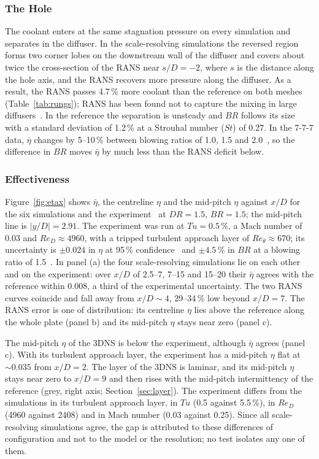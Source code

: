 \documentclass[colorlinks,upint,subscriptcorrection,varvw,hyphenate,balance,lineno]{asmeconf}
\newcommand*{\BR}{\mathit{BR}}
\newcommand*{\DR}{\mathit{DR}}
\newcommand*{\Reth}{\mathit{Re}_\theta}
\newcommand*{\ReD}{\mathit{Re}_D}
\newcommand*{\Tu}{\mathit{Tu}}
\newcommand*{\St}{\mathit{St}}
\newcommand*{\etab}{\bar\eta}
\begin{document}
\subsubsection{The Hole}

The coolant enters at the same stagnation pressure on every simulation and separates in the diffuser. In the
scale-resolving simulations the reversed region forms two corner lobes on the downstream wall of the diffuser and
covers about twice the cross-section of the RANS near $s/D=-2$, where $s$ is the distance along the hole axis, and
the RANS recovers more pressure along the diffuser. As a result, the RANS passes 4.7\,\% more coolant than the
reference on both meshes (Table~\ref{tab:rungs}); RANS has been found not to capture the mixing in large
diffusers~\cite{haydt2018}. In the reference the
separation is unsteady and $\BR$ follows its size with a standard deviation of 1.2\,\% at a Strouhal number ($\St$)
of 0.27. In the 7-7-7 data, $\etab$ changes by 5--10\,\% between blowing ratios of 1.0, 1.5 and
2.0~\cite{schroeder2014}, so the difference in $\BR$ moves $\etab$ by much less than the RANS deficit below.

\subsubsection{Effectiveness}

Figure~\ref{fig:etax} shows $\etab$, the centreline $\eta$ and the mid-pitch $\eta$ against $x/D$ for the six
simulations and the experiment~\cite{schroeder2014} at $\DR=1.5$, $\BR=1.5$; the mid-pitch line is
$|y/D|=2.91$. The experiment was run at $\Tu=0.5$\,\%, a Mach number of 0.03 and $\ReD\approx4960$, with a
tripped turbulent approach layer of $\Reth\approx670$; its uncertainty is $\pm0.024$ in $\eta$ at 95\,\%
confidence~\cite{schroeder2014} and $\pm4.5$\,\% in $\BR$ at a blowing ratio of 1.5~\cite{schroeder2015}.
In panel (a) the four scale-resolving simulations lie on each other and on the experiment: over $x/D$ of 2.5--7,
7--15 and 15--20 their $\etab$ agrees with the reference within 0.008, a third of the experimental uncertainty.
The two RANS curves coincide and fall away from $x/D\sim4$, 29--34\,\% low beyond $x/D=7$. The RANS
error is one of distribution: its centreline $\eta$ lies above the reference along the whole plate (panel b) and
its mid-pitch $\eta$ stays near zero (panel c).

The mid-pitch $\eta$ of the 3DNS is below the experiment, although $\etab$ agrees (panel c). With its turbulent
approach layer, the experiment has a mid-pitch $\eta$ flat at $\sim0.035$ from $x/D=2$. The layer of the 3DNS is
laminar, and its mid-pitch $\eta$ stays near zero to $x/D=9$ and then rises with the mid-pitch intermittency of
the reference (grey, right axis; Section~\ref{sec:layer}). The experiment differs from the simulations in its
turbulent approach layer, in $\Tu$ (0.5 against 5.5\,\%), in $\ReD$ (4960 against 2408) and in Mach number (0.03
against 0.25). Since all scale-resolving simulations agree, the gap is attributed to these differences of
configuration and not to the model or the resolution; no test isolates any one of them.
\end{document}
